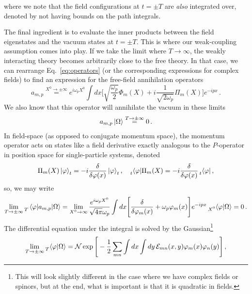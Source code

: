 \documentclass{article}
\numberwithin{equation}{subsection}
\begin{document}
where we note that the field configurations at $t = \pm T$ are \textit{also} integrated over, denoted by not having bounds on the path integrals.

The final ingredient is to evaluate the inner products between the field eigenstates and the vacuum states at $t=\pm T$. This is where our weak-coupling assumption comes into play. 
If we take the limit where $T\to \infty$, the weakly interacting theory becomes arbitrarily close to the free theory. In that case, we can rearrange Eq.~\eqref{eq:operators} 
(or the corresponding expressions for complex fields) to find an expression for the free-field annihilation operators
\begin{equation}
    a_{m,p} \overset{X^0\to\pm\infty}{=}e^{i\omega_p X^0}\int dx \Bigg[\sqrt{\frac{\omega_p}{2}}\Phi_m(X) + i \frac{1}{\sqrt{2\omega_p}}\Pi_m(X)\Bigg]e^{-ipx}\,.
\end{equation}
We also know that this operator will annihilate the vacuum in these limits
\begin{equation}
    a_{m,p}\ket{\Omega} \overset{T\to\pm\infty}{=} 0\,.
\end{equation}
In field-space (as opposed to conjugate momentum space), the momentum operator acts on states like a field derivative exactly analogous to the $P$-operator in position space 
for single-particle systems, denoted
\begin{equation}
    \Pi_m(X)\ket{\varphi}_t = -i\frac{\delta}{\delta \varphi(x)}\ket{\varphi}_t, \quad \prescript{}{t}{\bra{\varphi}}\Pi_m(X) = -i\frac{\delta}{\delta \varphi(x)}\prescript{}{t}{\bra{\varphi}}\,,
\end{equation}
so, we may write
\begin{equation}
    \lim_{T\to\pm\infty} \prescript{}{T}{\mel{\varphi}{a_{m,p}}{\Omega}} = \lim_{X^0\to\infty}\frac{e^{i\omega_p X^0}}{\sqrt{4\pi}\omega_p}
	\int dx\Bigg[\frac{\delta}{\delta \varphi_m(x)} + \omega_p \varphi_m(x)\Bigg]e^{-ipx}\prescript{}{X^0}{\braket{\varphi}{\Omega}} = 0\,.
\end{equation}
The differential equation under the integral is solved by the Gaussian\footnote{This will look slightly different in the case where we have complex fields or spinors, 
but at the end, what is important is that it is quadratic in fields.}
\begin{equation}
    \lim_{T\to\pm\infty}\prescript{}{T}{\braket{\varphi}{\Omega}} = \mathcal{N}\exp\Bigg[-\frac{1}{2}\sum_{mn}\int dx\int dy\,\mathcal{E}_{mn}(x, y)\varphi_m(x)\varphi_n(y)\Bigg]\,,
\end{equation}
\end{document}
